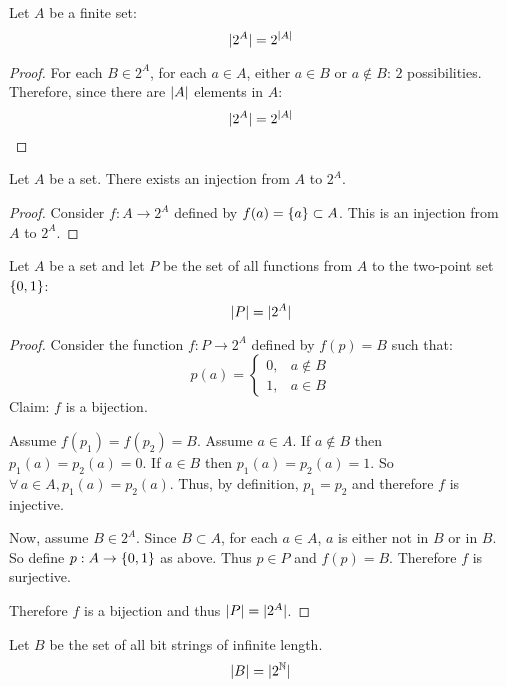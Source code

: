 \documentclass[letterpaper,12pt,fleqn]{article}
\begin{document}
\begin{theorem}
  Let \(A\) be a finite set:
  \[\lvert2^A\rvert=2^{\lvert A\rvert}\]
\end{theorem}

\begin{proof}
  For each \(B\in2^A\), for each \(a\in A\), either \(a\in B\) or \(a\notin B\): \(2\) possibilities.  Therefore,
  since there are \(\lvert A\rvert\) elements in \(A\):
  \[\lvert2^A\rvert=2^{\lvert A\rvert}\]
\end{proof}

\begin{theorem}
  Let \(A\) be a set.  There exists an injection from \(A\) to \(2^A\).
\end{theorem}

\begin{proof}
  Consider \(f:A\to2^A\) defined by \(f(a)=\{a\}\subset A\).  This is an injection from \(A\) to \(2^A\).
\end{proof}

\begin{theorem}
  Let \(A\) be a set and let \(P\) be the set of all functions from \(A\) to the two-point set \(\{0,1\}\):
  \[\lvert P\rvert=\lvert2^A\rvert\]
\end{theorem}

\begin{proof}
  Consider the function \(f:P\to2^A\) defined by \(f(p)=B\) such that:
  \[p(a)=\begin{cases}
  0, & a\notin B \\
  1, & a\in B
  \end{cases}\]
  Claim: \(f\) is a bijection.

  Assume \(f(p_1)=f(p_2)=B\).  Assume \(a\in A\).  If \(a\notin B\) then \(p_1(a)=p_2(a)=0\).  If \(a\in B\) then
  \(p_1(a)=p_2(a)=1\).  So \(\forall\,a\in A,p_1(a)=p_2(a)\).  Thus, by definition, \(p_1=p_2\) and therefore
  \(f\) is injective.

  Now, assume \(B\in 2^A\).  Since \(B\subset A\), for each \(a\in A\), \(a\) is either not in \(B\) or in \(B\).
  So define \(p:A\to\{0,1\}\) as above.  Thus \(p\in P\) and \(f(p)=B\).  Therefore \(f\) is surjective.

  Therefore \(f\) is a bijection and thus \(\lvert P\rvert=\lvert2^A\rvert\).
\end{proof}

\begin{theorem}
  Let \(B\) be the set of all bit strings of infinite length.
  \[\lvert B\rvert=\lvert2^{\mathbb{N}}\rvert\]
\end{theorem}
\end{document}
